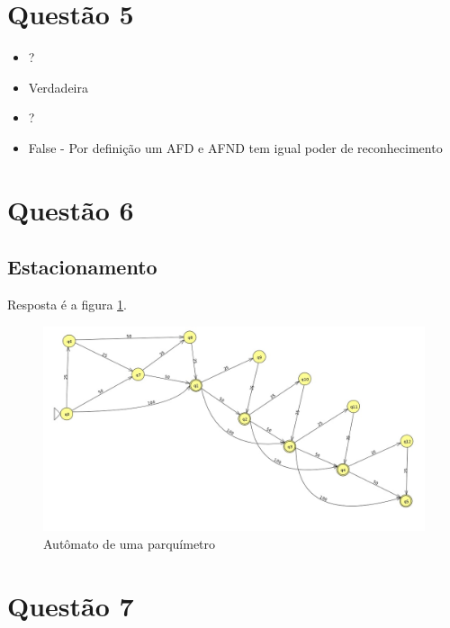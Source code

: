 \documentclass[11pt]{article}
\begin{document}
\section{Questão 5}
\label{sec:orgc164bc5}

\begin{itemize}
\item ?
\item Verdadeira
\item ?
\item False - Por definição um AFD e AFND tem igual poder de reconhecimento
\end{itemize}

\section{Questão 6}
\label{sec:org8d1c696}
\subsection{Estacionamento}
\label{sec:orgfb37697}
Resposta é a figura \ref{fig:orgb71360f}.
\begin{figure}[htbp]
\centering
\includegraphics[width=.9\linewidth]{./q6/estacionamento.jpg}
\caption{\label{fig:orgb71360f}
Autômato de uma parquímetro}
\end{figure}
\section{Questão 7}
\label{sec:org88cd497}
\end{document}
